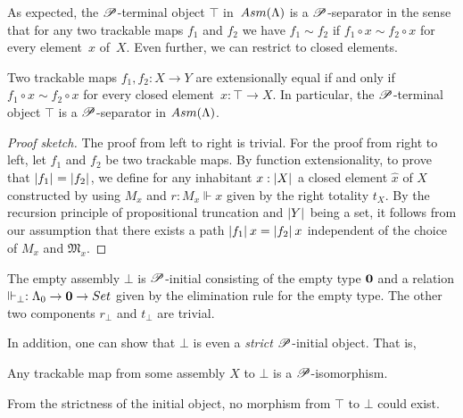 \documentclass[a4paper,UKenglish,numberwithinsect,cleveref,thm-restate,draft]{lipics-v2021}
\numberwithin{equation}{section}
\theoremstyle{definition}
\theoremstyle{plain}
\begin{document}
As expected, the $\mathscr{P}$-terminal object $\top$ in~$\Asm(\Lambda)$ is a $\mathscr{P}$-separator in the sense that for any two trackable maps $f_1$ and $f_2$ we have $f_1 \sim f_2$ if $f_1 \circ x \sim f_2 \circ x$ for every element~$x$ of~$X$.
Even further, we can restrict to closed elements.
\begin{proposition}
  Two trackable maps $f_1, f_2\colon X \to Y$ are extensionally equal if and only if $f_1 \circ x \sim f_2 \circ x$ for every closed element~$x\colon \top \to X$.
  In particular, the $\mathscr{P}$-terminal object $\top$ is a $\mathscr{P}$-separator in $\Asm(\Lambda)$.
\end{proposition}
\begin{proof}[Proof sketch]
  The proof from left to right is trivial.
  For the proof from right to left, let $f_1$ and $f_2$ be two trackable maps.
  By function extensionality, to prove that $\mathopen{}\left|f_1\right|_{}^{}\mathclose{} = \mathopen{}\left|f_2\right|_{}^{}\mathclose{}$, we define for any inhabitant $x : \mathopen{}\left|X\right|_{}^{}\mathclose{}$ a closed element $\hat{x}$ of $X$ constructed by  using $M_x$ and $r : M_x \Vdash x$ given by the right totality $t_X$.
  By the recursion principle of propositional truncation and $\mathopen{}\left|Y\right|_{}^{}\mathclose{}$ being a set, it follows from our assumption that there exists a path $\mathopen{}\left|f_1\right|_{}^{}\mathclose{}\,x = \mathopen{}\left|f_2\right|_{}^{}\mathclose{}\, x$ independent of the choice of $M_x$ and $\mathfrak{M}_x$.
\end{proof}

\begin{example}
The empty assembly $\bot$ is $\mathscr{P}$-initial consisting of the empty type $\mathbf{0}$ and a relation $\Vdash_\bot : \Lambda_0 \to \Empty \to \set$ given by the elimination rule for the empty type.
The other two components $r_\bot$ and $t_\bot$ are trivial.
\end{example}

In addition, one can show that $\bot$ is even a \emph{strict} $\mathscr{P}$-initial object. That is, 
\begin{proposition}\label{prop:strict-initial}
  Any trackable map from some assembly $X$ to $\bot$ is a $\mathscr{P}$-isomorphism. 
\end{proposition}
From the strictness of the initial object, no morphism from $\top$ to $\bot$ could exist.
\end{document}
